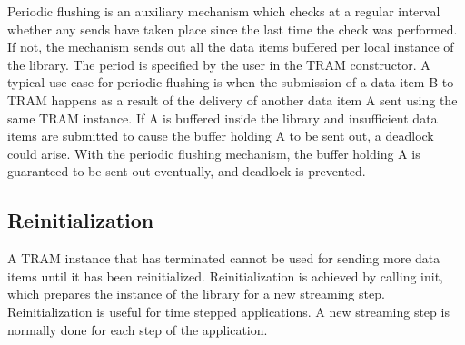 Periodic flushing is an auxiliary mechanism which checks at a regular
interval whether any sends have taken place since the last time the
check was performed. If not, the mechanism sends out all the data
items buffered per local instance of the library. The period is
specified by the user in the TRAM constructor. A typical use case
for periodic flushing is when the submission of a data item B to
TRAM happens as a result of the delivery of another data item A
sent using the same TRAM instance. If A is buffered inside the library
and insufficient data items are submitted to cause the buffer holding
A to be sent out, a deadlock could arise. With the periodic flushing
mechanism, the buffer holding A is guaranteed to be sent out
eventually, and deadlock is prevented.


\subsection{Reinitialization}

A TRAM instance that has terminated cannot be used for
sending more data items until it has been
reinitialized. Reinitialization is achieved by calling init, which
prepares the instance of the library for a new streaming
step. Reinitialization is useful for time stepped applications. A new
streaming step is normally done for each step of the application.



\thispagestyle{empty}
\pagestyle{empty}

%
